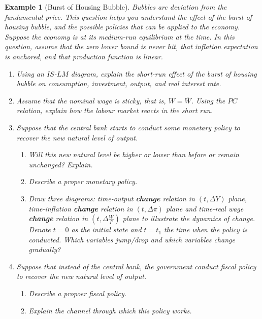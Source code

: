 \documentclass[12pt]{article}
\newtheorem{example}{Example}
\begin{document}
\begin{example}[Burst of Housing Bubble]
  Bubbles are deviation from the fundamental price. This question helps you understand the effect of the burst of housing bubble, and the possible policies that can be applied to the economy. Suppose the economy is at its medium-run equilibrium at the time. In this question, assume that the zero lower bound is never hit, that inflation expectation is anchored, and that production function is linear.
  \begin{enumerate}[label=(\arabic*)]
    \item Using an $IS$-$LM$ diagram, explain the short-run effect of the burst of housing bubble on consumption, investment, output, and real interest rate.
    \vspace{80pt}
    \newpage
    \item Assume that the nominal wage is sticky, that is, $W=\bar{W}$. Using the $PC$ relation, explain how the labour market reacts in the short run. 
    \vspace{80pt}
    \item Suppose that the central bank starts to conduct some monetary policy to recover the new natural level of output.
    \begin{enumerate}[label=\alph*.]
      \item Will this new natural level be higher or lower than before or remain unchanged? Explain.
      \vspace{80pt}
      \item Describe a proper monetary policy.
      \vspace{80pt}
      \item Draw three diagrams: time-output \textbf{change} relation in $(t, \Delta Y)$ plane, time-inflation \textbf{change}  relation in $(t, \Delta \pi)$ plane and time-real wage \textbf{change}  relation in $(t, \Delta \frac{W}{P})$ plane to illustrate the dynamics of change. Denote $t=0$ as the initial state and $t=t_1$ the time when the policy is conducted. Which variables jump/drop and which variables change gradually?
    \end{enumerate}
    \vspace{120pt}
    \newpage
    \item Suppose that instead of the central bank, the government conduct fiscal policy to recover the new natural level of output. 
    \begin{enumerate}
      \item Describe a propoer fiscal policy.
      \vspace{80pt}
      \item Explain the channel through which this policy works.
      \vspace{80pt}
    \end{enumerate}
  \end{enumerate}
\end{example}
\end{document}

